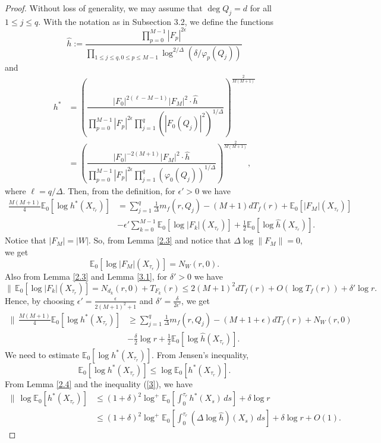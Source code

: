 \documentclass[12pt]{amsart}
\newcommand{\bbE}{\mathbb{E}}
\begin{document}
\begin{proof} Without loss of generality, we may assume that $\deg Q_j=d$ for all $1\le j\le q$. With the notation as in Subsection 3.2, we define the functions
$$\hat{h} := \dfrac{\prod_{p=0}^{M-1}|F_{p}|^{2\epsilon}}{\prod_{1\le j\le q,0\le p\le M-1}\log^{2/\Delta}\left(\delta/\varphi_{p}(Q_j)\right)}$$
and
\begin{align*}
{h}^*&=\left (\dfrac{|F_{0}|^{2(\ell-M-1)}|F_{M}|^2\cdot\hat{h}}{\prod_{p=0}^{M-1}|F_{p}|^{2\epsilon}\prod_{j=1}^q(|F_{0}(Q_j)|^2)^{1/\Delta}}\right)^{\frac{2}{M(M+1)}}\\
&=\left (\dfrac{|F_{0}|^{-2(M+1)}|F_{M}|^2\cdot\hat{h}}{\prod_{p=0}^{M-1}|F_{p}|^{2\epsilon}\prod_{j=1}^q(\varphi_0(Q_j))^{1/\Delta}}\right)^{\frac{2}{M(M+1)}},
\end{align*}
where $\ell=q/\Delta$. Then, from the definition, for $\epsilon'>0$ we have
\begin{align*}
\frac{M(M+1)}{4} \bbE_0[\log {h}^*(X_{\tau_r})]&= \sum_{j=1}^{q}\frac{1}{\Delta}m_f(r,Q_j)- (M+1)dT_f(r) + \bbE_0[|F_M|(X_{\tau_r})]\\
&-\epsilon'\sum_{k=0}^{M-1} \bbE_0[\log|F_k|(X_{\tau_r})] + \frac{1}{2} \bbE_0[\log \hat{h}(X_{\tau_r})].
\end{align*}
Notice that $|F_M|=|W|$. So, from Lemma \ref{2.3} and notice that $\Delta \log \|F_M\| = 0$, we get
$$\bbE_0[\log|F_M|(X_{\tau_r})] = N_W(r,0).$$
Also from Lemma \ref{2.3} and Lemma \ref{3.1}, for $\delta'>0$ we have
$$\|\,\bbE_0[\log|F_k|(X_{\tau_r})] = N_{d_k}(r,0) + T_{F_k}(r) \leq 2(M+1)^2dT_f(r) + O(\log T_f(r)) + \delta'\log r.$$
Hence, by choosing $\epsilon'=\frac{\epsilon}{2(M+1)^2+1}$ and $\delta'=\frac{\delta}{2\epsilon'}$, we get
\begin{align*}
\bigl\|\, \frac{M(M+1)}{4} \bbE_0[\log{h}^*(X_{\tau_r})]& \geq \sum_{j=1}^q\frac{1}{\Delta}m_f(r,Q_j) -(M+1+\epsilon)dT_f(r) + N_W(r,0)\\
&-\frac{\delta}{2}\log r+\frac{1}{2}\bbE_0[\log \hat{h}(X_{\tau_r})].
\end{align*}
We need to estimate $\bbE_0[\log{h}^*(X_{\tau_r})]$. From Jensen's inequality,
$$\bbE_0[\log{h}^*(X_{\tau_r})] \leq \log \bbE_0[{h}^*(X_{\tau_r})].$$
From Lemma \ref{2.4} and the inequality (\ref{3}), we have
\begin{align*}
\|\, \log \bbE_0[{h}^*(X_{\tau_r})]&\leq (1+\delta)^2 \log^+ \bbE_0 \left[ \int_{0}^{\tau_r} h^*(X_s)\, ds \right] + \delta \log r\\
&\leq (1+\delta)^2 \log^+ \bbE_0 \left[ \int_{0}^{\tau_r} (\Delta\log\hat{h})(X_s)\, ds \right] + \delta \log r+O(1).

\end{align*}
\end{proof}
\end{document}
